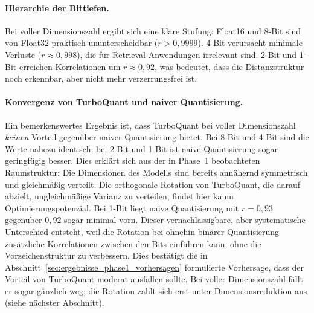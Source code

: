 \paragraph{Hierarchie der Bittiefen.}
Bei voller Dimensionszahl ergibt sich eine klare Stufung: Float16 und 8-Bit sind von Float32 praktisch ununterscheidbar ($r > 0{,}9999$).
4-Bit verursacht minimale Verluste ($r \approx 0{,}998$), die für Retrieval-Anwendungen irrelevant sind.
2-Bit und 1-Bit erreichen Korrelationen um $r \approx 0{,}92$, was bedeutet, dass die Distanzstruktur noch erkennbar, aber nicht mehr verzerrungsfrei ist.
%
\paragraph{Konvergenz von TurboQuant und naiver Quantisierung.}
Ein bemerkenswertes Ergebnis ist, dass TurboQuant bei voller Dimensionszahl \emph{keinen} Vorteil gegenüber naiver Quantisierung bietet.
Bei 8-Bit und 4-Bit sind die Werte nahezu identisch; bei 2-Bit und 1-Bit ist naive Quantisierung sogar geringfügig besser.
Dies erklärt sich aus der in Phase~1 beobachteten Raumstruktur: Die Dimensionen des Modells sind bereits annähernd symmetrisch und gleichmäßig verteilt.
Die orthogonale Rotation von TurboQuant, die darauf abzielt, ungleichmäßige Varianz zu verteilen, findet hier kaum Optimierungspotenzial.
Bei 1-Bit liegt naive Quantisierung mit $r = 0{,}93$ gegenüber $0{,}92$ sogar minimal vorn. Dieser vernachlässigbare, aber systematische Unterschied entsteht, weil die Rotation bei ohnehin binärer Quantisierung zusätzliche Korrelationen zwischen den Bits einführen kann, ohne die Vorzeichenstruktur zu verbessern.
%
Dies bestätigt die in Abschnitt~\ref{sec:ergebnisse_phase1_vorhersagen} formulierte Vorhersage, dass der Vorteil von TurboQuant moderat ausfallen sollte.
Bei voller Dimensionszahl fällt er sogar gänzlich weg; die Rotation zahlt sich erst unter Dimensionsreduktion aus (siehe nächster Abschnitt).
%
